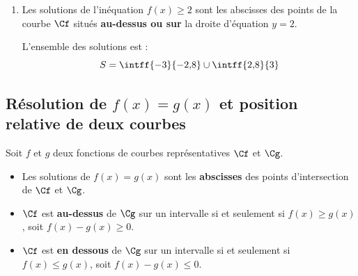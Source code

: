 \begin{methode}[Résoudre graphiquement $f(x) = k$ et $f(x) \ge k$]
\begin{correction}
\begin{enumerate}
			      Elle coupe la courbe $\Cf$ en deux points d'abscisses $-2{,}8$ et $2{,}8$.

			      L'ensemble des solutions de l'équation $f(x) = 2$ est :
			      \[
				      S = \{-2{,}8\,;\,2{,}8\}
			      \]

			\item Les solutions de l'inéquation $f(x) \ge 2$ sont les abscisses des points de la courbe $\Cf$ situés \textbf{au-dessus ou sur} la droite d'équation $y = 2$.

			      L'ensemble des solutions est :
			      \[
				      S = \intff{-3}{-2{,}8} \cup \intff{2{,}8}{3}
			      \]
		\end{enumerate}
	\end{correction}
\end{methode}

\subsection{Résolution de $f(x) = g(x)$ et position relative de deux courbes}

\begin{prop}
	Soit $f$ et $g$ deux fonctions de courbes représentatives $\Cf$ et $\Cg$.
	\begin{itemize}
		\item Les solutions de $f(x) = g(x)$ sont les \textbf{abscisses} des points d'intersection de $\Cf$ et $\Cg$.
		\item $\Cf$ est \textbf{au-dessus} de $\Cg$ sur un intervalle si et seulement si $f(x) \ge g(x)$, soit $f(x) - g(x) \ge 0$.
		\item $\Cf$ est \textbf{en dessous} de $\Cg$ sur un intervalle si et seulement si $f(x) \le g(x)$, soit $f(x) - g(x) \le 0$.
	\end{itemize}
\end{prop}

